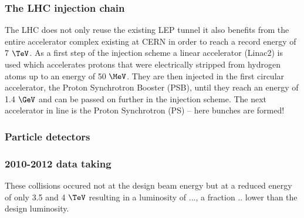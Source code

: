 \subsubsection{The LHC injection chain}
The LHC does not only reuse the existing LEP tunnel it also benefits from the entire accelerator complex existing at CERN in order to reach a record energy of 7 $\TeV$. As a first step of the injection scheme a linear accelerator (Linac2) is used which accelerates protons that were electrically stripped from hydrogen atoms up to an energy of 50 $\MeV$. They are then injected in the first circular accelerator, the Proton Synchrotron Booster (PSB), until they reach an energy of 1.4 $\GeV$ and can be passed on further in the injection scheme. The next accelerator in line is the Proton Synchrotron (PS) -- here bunches are formed!

\subsubsection{Particle detectors}

\subsubsection{2010-2012 data taking}
These collisions occured not at the design beam energy but at a reduced energy of only 3.5 and 4 $\TeV$ resulting in a luminosity of ..., a fraction .. lower than the design luminosity.

